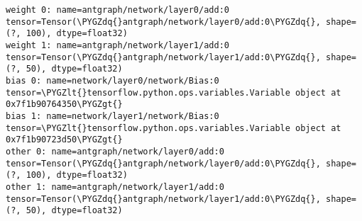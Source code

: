 \documentclass[letterpaper,10pt,english]{sphinxmanual}
\def\PYGZlt{\char`\<}
\def\PYGZgt{\char`\>}
\def\PYGZdq{\char`\"}
\begin{document}
\begin{Verbatim}[commandchars=\\\{\}]
weight 0: name=antgraph/network/layer0/add:0 tensor=Tensor(\PYGZdq{}antgraph/network/layer0/add:0\PYGZdq{}, shape=(?, 100), dtype=float32)
weight 1: name=antgraph/network/layer1/add:0 tensor=Tensor(\PYGZdq{}antgraph/network/layer1/add:0\PYGZdq{}, shape=(?, 50), dtype=float32)
bias 0: name=network/layer0/network/Bias:0 tensor=\PYGZlt{}tensorflow.python.ops.variables.Variable object at 0x7f1b90764350\PYGZgt{}
bias 1: name=network/layer1/network/Bias:0 tensor=\PYGZlt{}tensorflow.python.ops.variables.Variable object at 0x7f1b90723d50\PYGZgt{}
other 0: name=antgraph/network/layer0/add:0 tensor=Tensor(\PYGZdq{}antgraph/network/layer0/add:0\PYGZdq{}, shape=(?, 100), dtype=float32)
other 1: name=antgraph/network/layer1/add:0 tensor=Tensor(\PYGZdq{}antgraph/network/layer1/add:0\PYGZdq{}, shape=(?, 50), dtype=float32)
\end{Verbatim}
\label{config:module-config}
\end{document}
